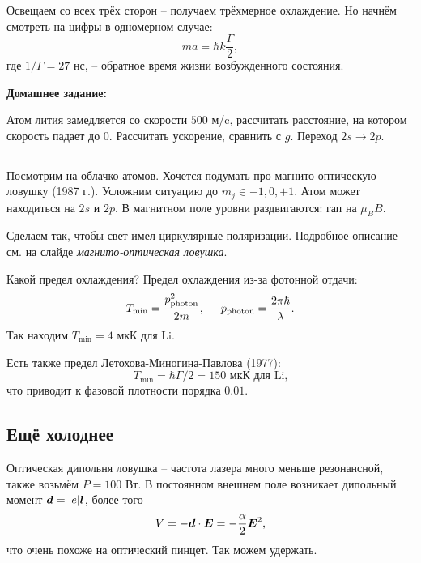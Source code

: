Освещаем со всех трёх сторон -- получаем трёхмерное охлаждение. Но начнём смотреть на цифры в одномерном случае:
\begin{equation*}
    m a = \hbar k \frac{\Gamma}{2},
\end{equation*}
где $1/\Gamma = 27$ нс, -- обратное время жизни возбужденного состояния.

\phantom{42}

\noindent
\textbf{Домашнее задание:} \hrulefill
\vspace{-2mm}
\begin{enumerate*}
    \item Атом лития замедляется со скорости $500$ м/c, рассчитать расстояние, на котором скорость падает до $0$. 
    Рассчитать ускорение, сравнить с $g$. Переход $2 s\to 2p$.
\end{enumerate*}
\hrule

\phantom{42}


Посмотрим на облачко атомов. Хочется подумать про магнито-оптическую ловушку (1987 г.). Усложним ситуацию до $m_j \in {-1, 0, +1}$. Атом может находиться на $2s$ и $2p$. В магнитном поле уровни раздвигаются: гап на $\mu_B B$. 

Сделаем так, чтобы свет имел циркулярные поляризации. 
Подробное описание см. на слайде \textit{магнито-оптическая ловушка}.




Какой предел охлаждения? Предел охлаждения из-за фотонной отдачи:
\begin{equation*}
    T_{\text{min}} = \frac{p_{\text{photon}}^2}{2m},
    \hspace{5 mm} 
    p_{\text{photon}} = \frac{2\pi \hbar}{\lambda}.
\end{equation*}
Так находим $T_{\text{min}} = 4$ мкК для Li. 

Есть также предел Летохова-Миногина-Павлова (1977):
\begin{equation*}
    T_{\text{min}} = \hbar \Gamma / 2 = 150 \text{ мкК для Li,}
\end{equation*}
что приводит к фазовой плотности порядка $0.01$.





\subsection{Ещё холоднее}


Оптическая дипольня ловушка -- частота лазера много меньше резонансной, также возьмём $P = 100$ Вт. В постоянном внешнем поле возникает дипольный момент $\mbox{\boldmath $d$} = |e| \mbox{\boldmath $l$}$, более того
\begin{equation*}
    V = - \mbox{\boldmath $d$} \cdot \mbox{\boldmath $E$} = - \frac{\alpha}{2} \mbox{\boldmath $E$}^2,
\end{equation*}
что очень похоже на оптический пинцет. Так можем удержать.

